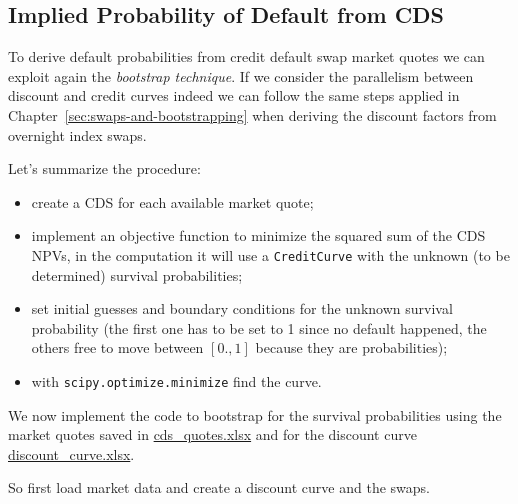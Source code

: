 \subsection{Implied Probability of Default from CDS}
\label{default-probabilities-and-cds}

To derive default probabilities from credit default swap market quotes we can exploit again the \emph{bootstrap technique}. If we consider the parallelism between discount and credit curves indeed we can follow the same steps applied in Chapter~\ref{sec:swaps-and-bootstrapping} when deriving the discount factors from overnight index swaps.

Let's summarize the procedure: 
\begin{itemize}
\tightlist
\item create a CDS for each available market quote;
\item implement an objective function to minimize the squared sum of the CDS NPVs, in the computation it will use a \texttt{CreditCurve} with the unknown (to be determined) survival probabilities;
\item set initial guesses and boundary conditions for the unknown survival probability (the first one has to be set to 1 since no default happened, the others free to move between $[0., 1]$ because they are probabilities);
\item with \texttt{scipy.optimize.minimize} find the curve.
\end{itemize}

We now implement the code to bootstrap for the survival probabilities using the market quotes saved in \href{https://github.com/matteosan1/finance_course/raw/develop/libro/input_files/cds_quotes.xlsx}{cds\_quotes.xlsx} and for the discount curve \href{https://github.com/matteosan1/finance_course/raw/develop/libro/input_files/discount_curve.xlsx}{discount\_curve.xlsx}.

So first load market data and create a discount curve and the swaps.

